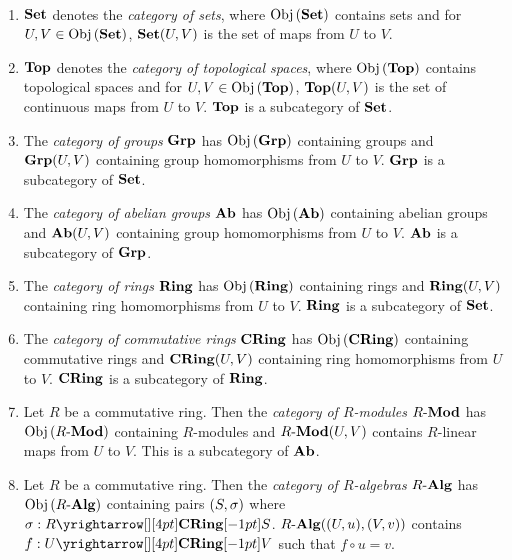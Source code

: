 \begin{eg}~
  \begin{enumerate}
    \item $\mathbf{Set}$ denotes the \emph{category of sets}, where 
    $\mathrm{Obj}\left(\mathbf{Set}\right)$ contains sets and for $U, V \in \mathrm{Obj}\left(\mathbf{Set}\right)$, 
    $\mathbf{Set}(U,V)$ is the set of maps from $U$ to $V$. 
    \item $\mathbf{Top}$ denotes the \emph{category of topological spaces}, where
    $\mathrm{Obj}\left(\mathbf{Top}\right)$ contains topological spaces and for $U, V \in \mathrm{Obj}\left(\mathbf{Top}\right)$, 
    $\mathbf{Top}(U,V)$ is the set of continuous maps from $U$ to $V$. 
    $\mathbf{Top}$ is a subcategory of $\mathbf{Set}$. 
    \item The \emph{category of groups} $\mathbf{Grp}$ has 
    $\mathrm{Obj}\left(\mathbf{Grp}\right)$ containing groups and 
    $\mathbf{Grp}(U,V)$ containing group homomorphisms from $U$ to $V$. 
    $\mathbf{Grp}$ is a subcategory of $\mathbf{Set}$.  
    \item The \emph{category of abelian groups} $\mathbf{Ab}$ has 
    $\mathrm{Obj}\left(\mathbf{Ab}\right)$ containing abelian groups and 
    $\mathbf{Ab}(U,V)$ containing group homomorphisms from $U$ to $V$. 
    $\mathbf{Ab}$ is a subcategory of $\mathbf{Grp}$. 
    \item The \emph{category of rings} $\mathbf{Ring}$ has 
    $\mathrm{Obj}\left(\mathbf{Ring}\right)$ containing rings and 
    $\mathbf{Ring}(U,V)$ containing ring homomorphisms from $U$ to $V$.
    $\mathbf{Ring}$ is a subcategory of $\mathbf{Set}$. 
    \item The \emph{category of commutative rings} $\mathbf{CRing}$ has 
    $\mathrm{Obj}\left(\mathbf{CRing}\right)$ containing commutative rings and 
    $\mathbf{CRing}(U,V)$ containing ring homomorphisms from $U$ to $V$.
    $\mathbf{CRing}$ is a subcategory of $\mathbf{Ring}$. 
    \item Let $R$ be a commutative ring. 
    Then the \emph{category of $R$-modules} $R\text{-}\mathbf{Mod}$ has 
    $\mathrm{Obj}\left(R\text{-}\mathbf{Mod}\right)$ containing $R$-modules and 
    $R\text{-}\mathbf{Mod}(U,V)$ contains $R$-linear maps from $U$ to $V$.
    This is a subcategory of $\mathbf{Ab}$. 
    \item Let $R$ be a commutative ring. 
    Then the \emph{category of $R$-algebras} $R\text{-}\mathbf{Alg}$ has 
    $\mathrm{Obj}\left(R\text{-}\mathbf{Alg}\right)$ containing pairs $(S,\sigma)$ where $\si : \map{R}{S}{\CRING}{}$.
    $R\text{-}\mathbf{Alg}((U,u),(V,v))$ contains $f : \map{U}{V}{\CRING}{}$ such that 
    $f \circ u = v$. 
  \end{enumerate}
\end{eg}

